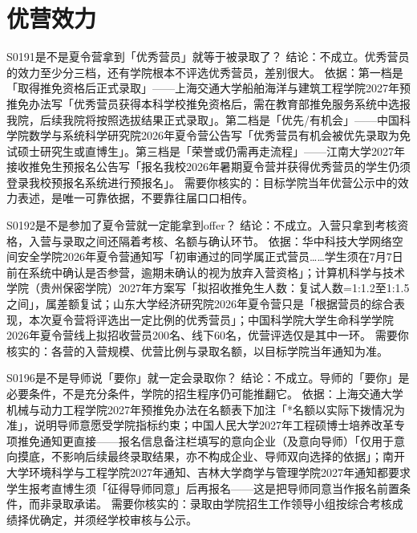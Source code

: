 \section{优营效力}
\begin{qa}{S0191}{是不是夏令营拿到「优秀营员」就等于被录取了？}
结论：不成立。优秀营员的效力至少分三档，还有学院根本不评选优秀营员，差别很大。
依据：第一档是「取得推免资格后正式录取」——上海交通大学船舶海洋与建筑工程学院2027年预推免办法写「优秀营员获得本科学校推免资格后，需在教育部推免服务系统中选报我院，后续我院将按照选拔结果正式录取」。第二档是「优先/有机会」——中国科学院数学与系统科学研究院2026年夏令营公告写「优秀营员有机会被优先录取为免试硕士研究生或直博生」。第三档是「荣誉或仍需再走流程」——江南大学2027年接收推免生预报名公告写「报名我校2026年暑期夏令营并获得优秀营员的学生仍须登录我校预报名系统进行预报名」。
需要你核实的：目标学院当年优营公示中的效力表述，是唯一可靠依据，不要靠往届口口相传。
\end{qa}

\begin{qa}{S0192}{是不是参加了夏令营就一定能拿到offer？}
结论：不成立。入营只拿到考核资格，入营与录取之间还隔着考核、名额与确认环节。
依据：华中科技大学网络空间安全学院2026年夏令营通知写「初审通过的同学属正式营员……学生须在7月7日前在系统中确认是否参营，逾期未确认的视为放弃入营资格」；计算机科学与技术学院（贵州保密学院）2027年方案写「拟招收推免生人数：复试人数=1:1.2至1:1.5之间」，属差额复试；山东大学经济研究院2026年夏令营只是「根据营员的综合表现，本次夏令营将评选出一定比例的优秀营员」；中国科学院大学生命科学学院2026年夏令营线上拟招收营员200名、线下60名，优营评选仅是其中一环。
需要你核实的：各营的入营规模、优营比例与录取名额，以目标学院当年通知为准。
\end{qa}

\begin{qa}{S0196}{是不是导师说「要你」就一定会录取你？}
结论：不成立。导师的「要你」是必要条件，不是充分条件，学院的招生程序仍可能推翻它。
依据：上海交通大学机械与动力工程学院2027年预推免办法在名额表下加注「*名额以实际下拨情况为准」，说明导师意愿受学院指标约束；中国人民大学2027年工程硕博士培养改革专项推免通知更直接——报名信息备注栏填写的意向企业（及意向导师）「仅用于意向摸底，不影响后续最终录取结果，亦不构成企业、导师双向选择的依据」；南开大学环境科学与工程学院2027年通知、吉林大学商学与管理学院2027年通知都要求学生报考直博生须「征得导师同意」后再报名——这是把导师同意当作报名前置条件，而非录取承诺。
需要你核实的：录取由学院招生工作领导小组按综合考核成绩择优确定，并须经学校审核与公示。
\end{qa}

